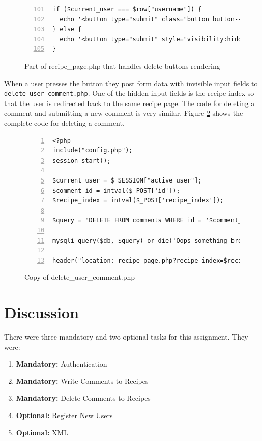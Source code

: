 \documentclass[a4paper]{scrartcl}
\begin{document}
\begin{figure}
\begin{lstlisting}[frame=single, numbers=left, breaklines=true, basicstyle=\ttfamily\footnotesize, firstnumber=101]
if ($current_user === $row["username"]) {
  echo '<button type="submit" class="button button--danger">Delete comment</button>';
} else {
  echo '<button type="submit" style="visibility:hidden" class="button button--danger">Delete comment</button>';
}
\end{lstlisting}
\caption{Part of recipe\_page.php that handles delete buttons rendering}
\label{fig:comment-section-code}
\end{figure}

When a user presses the button they post form data with invisible input fields to \texttt{delete\_user\_comment.php}. One of the hidden input fields is the recipe index so that the user is redirected back to the same recipe page. The code for deleting a comment and submitting a new comment is very similar. Figure \ref{fig:comment-delete-code} shows the complete code for deleting a comment.

\begin{figure}
\begin{lstlisting}[frame=single, numbers=left, breaklines=true, basicstyle=\ttfamily\footnotesize]
<?php
include("config.php");
session_start();

$current_user = $_SESSION["active_user"];
$comment_id = intval($_POST['id']);
$recipe_index = intval($_POST['recipe_index']);

$query = "DELETE FROM comments WHERE id = '$comment_id' AND username = '$current_user'";

mysqli_query($db, $query) or die('Oops something broke! Please try again at a later time.');

header("location: recipe_page.php?recipe_index=$recipe_index");
\end{lstlisting}
	\caption{Copy of delete\_user\_comment.php}
	\label{fig:comment-delete-code}
\end{figure}

\section{Discussion}
There were three mandatory and two optional tasks for this assignment. They were:

\begin{enumerate}
\item \textbf{Mandatory:} Authentication
\item \textbf{Mandatory:} Write Comments to Recipes
\item \textbf{Mandatory:} Delete Comments to Recipes
\item \textbf{Optional:} Register New Users
\item \textbf{Optional:} XML
\end{enumerate}
\end{document}
